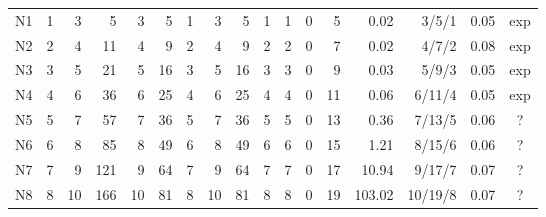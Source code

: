 \begin{table}[t]
\begin{tabular}{@{}lrrrrrrrrrrrrrrrc@{}}
N1 & 1 & 3 & 5 & 3 & 5 & 1 & 3 & 5 & 1 & 1 & 0 & 5 & 0.02 & 3/5/1 & 0.05 & exp\\
N2 & 2 & 4 & 11 & 4 & 9 & 2 & 4 & 9 & 2 & 2 & 0 & 7 & 0.02 & 4/7/2 & 0.08 & exp\\
N3 & 3 & 5 & 21 & 5 & 16 & 3 & 5 & 16 & 3 & 3 & 0 & 9 & 0.03 & 5/9/3 & 0.05 & exp\\
N4 & 4 & 6 & 36 & 6 & 25 & 4 & 6 & 25 & 4 & 4 & 0 & 11 & 0.06 & 6/11/4 & 0.05 & exp\\
N5 & 5 & 7 & 57 & 7 & 36 & 5 & 7 & 36 & 5 & 5 & 0 & 13 & 0.36 & 7/13/5 & 0.06 & ?\\
N6 & 6 & 8 & 85 & 8 & 49 & 6 & 8 & 49 & 6 & 6 & 0 & 15 & 1.21 & 8/15/6 & 0.06 & ?\\
N7 & 7 & 9 & 121 & 9 & 64 & 7 & 9 & 64 & 7 & 7 & 0 & 17 & 10.94 & 9/17/7 & 0.07 & ?\\
N8 & 8 & 10 & 166 & 10 & 81 & 8 & 10 & 81 & 8 & 8 & 0 & 19 & 103.02 & 10/19/8 & 0.07 & ?\\
\bottomrule
\end{tabular}
\end{table}
